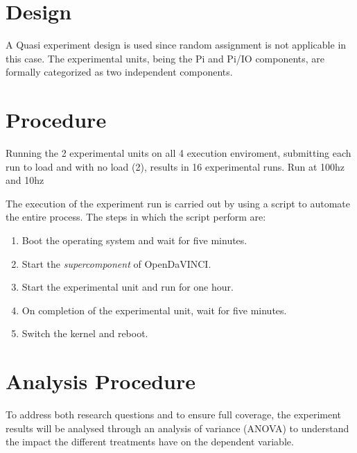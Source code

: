\section{Design}
A Quasi experiment design is used since random assignment is not applicable in this case. The experimental units, being the Pi and Pi/IO components, are formally categorized as two independent components. 


\section{Procedure}
Running the 2 experimental units on all 4 execution enviroment, submitting each run to load and with no load (2), results in 16 experimental runs. Run at 100hz and 10hz 


The execution of the experiment run is carried out by using a script to automate the entire process. The steps in which the script perform are:

\begin{enumerate}  
\item Boot the operating system and wait for five minutes.  
\item Start the \textit{supercomponent} of OpenDaVINCI.
\item Start the experimental unit and run for one hour.
\item On completion of the experimental unit, wait for five minutes.
\item Switch the kernel and reboot.\\ 
\end{enumerate}

\begin{center}\end{center}


\section{Analysis Procedure}
To address both research questions and to ensure full coverage, the experiment results will be analysed through an analysis of variance (ANOVA) to understand the impact the different treatments have on the dependent variable.\\









